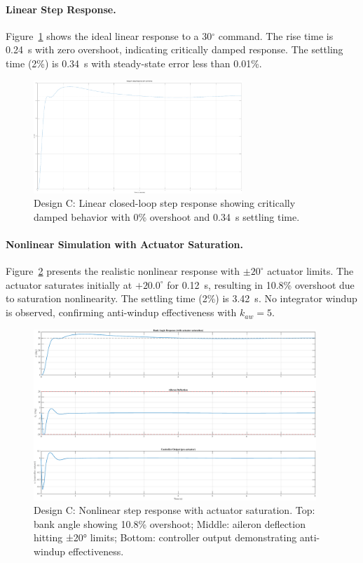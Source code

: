 \paragraph{Linear Step Response.}
Figure~\ref{fig:design_C_step} shows the ideal linear response to a 30$^\circ$ command. The rise time is 0.24~s with zero overshoot, indicating critically damped response. The settling time (2\%) is 0.34~s with steady-state error less than 0.01\%.

\begin{figure}[h!]
\centering
\includegraphics[width=0.7\textwidth]{../MATLAB/LaTeX_Exports/design_C_step.pdf}
\caption{Design C: Linear closed-loop step response showing critically damped behavior with 0\% overshoot and 0.34~s settling time.}
\label{fig:design_C_step}
\end{figure}

\paragraph{Nonlinear Simulation with Actuator Saturation.}
Figure~\ref{fig:nonlinear_response} presents the realistic nonlinear response with $\pm20^\circ$ actuator limits. The actuator saturates initially at $+20.0^\circ$ for 0.12~s, resulting in 10.8\% overshoot due to saturation nonlinearity. The settling time (2\%) is 3.42~s. No integrator windup is observed, confirming anti-windup effectiveness with $k_{aw}=5$.

\begin{figure}[h!]
\centering
\includegraphics[width=0.95\textwidth]{../MATLAB/LaTeX_Exports/nonlinear_response.pdf}
\caption{Design C: Nonlinear step response with actuator saturation. Top: bank angle showing 10.8\% overshoot; Middle: aileron deflection hitting ±20° limits; Bottom: controller output demonstrating anti-windup effectiveness.}
\label{fig:nonlinear_response}
\end{figure}

